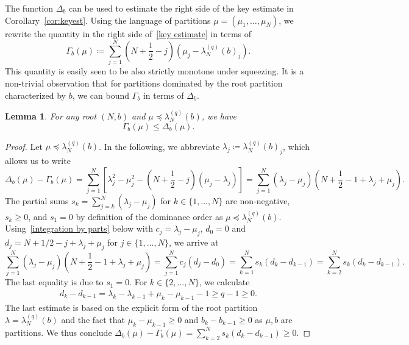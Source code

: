 \documentclass[letterpaper, DIV=17]{scrartcl}
\newtheorem{lemma}[theorem]{Lemma}
\numberwithin{equation}{section}
\theoremstyle{definition}
\begin{document}
The function $ \Delta_b $ can be used to estimate the right side of the key estimate in Corollary~\ref{cor:keyest}. Using the language of partitions $\mu=(\mu_1, \dots, \mu_N)$, we rewrite the quantity in the right side of~\eqref{key estimate} in terms of	
	\begin{equation}\label{def:Gamma}
			\Gamma_b(\mu) \coloneqq \sum_{j=1}^N (N+\frac{1}{2}-j)(\mu_j -\lambda_N^{(q)}(b)_j) .
	\end{equation}
	This quantity is easily seen to be also strictly monotone under squeezing. It is a non-trivial observation that
		for partitions dominated by the root partition characterized by $ b $, we can bound $\Gamma_b$ in terms of $\Delta_b$. 

	
		 \begin{lemma}\label{lem:GammaDelta}
		For any root $ (N,b)$ and $ \mu\preceq \lambda^{(q)}_N(b) $,
		we have
			\begin{equation} \label{Gamma bounded by Delta}
				\Gamma_b(\mu) \leq \Delta_b(\mu).
			\end{equation}  
		\end{lemma}
		\begin{proof}
			Let $\mu \preceq \lambda_N^{(q)}(b)$. In the following, we abbreviate $\lambda_j \coloneqq \lambda_N^{(q)}(b)_j$, which allows us to write
			$$
				\Delta_b(\mu) - \Gamma_b(\mu) = \sum_{j=1}^N \left[\lambda_j^2-\mu_j^2 - (N+\frac{1}{2}-j)(\mu_j-\lambda_j)\right]
				= \sum_{j=1}^N (\lambda_j-\mu_j)(N+\frac{1}{2}-1+\lambda_j+\mu_j).
			$$
			The partial sums $s_k=\sum_{j=k}^N (\lambda_j-\mu_j)$ for $k\in \{1, \dots, N\}$ are non-negative, $s_k\geq 0$, and $s_1=0$  by definition of the dominance order as  $\mu \preceq \lambda_N^{(q)}(b)$. 
			Using~\eqref{integration by parts} below with $c_j =\lambda_j-\mu_j$, $d_0=0$ and  $d_j=N+1/2-j+\lambda_j+\mu_j$ for $j\in \{1, \dots, N\}$, we arrive at 
			$$
				\sum_{j=1}^N (\lambda_j-\mu_j)(N+\frac{1}{2}-1+\lambda_j+\mu_j)
				=\sum_{j=1}^N c_j (d_j-d_0)
				= \sum_{k=1}^N s_k (d_k-d_{k-1})
				= \sum_{k=2}^N s_k (d_k-d_{k-1}).
			$$
			The last equality is due to $s_1=0$. For $k\in \{2, \dots, N\}$, we calculate 
			\begin{align*}
				d_k-d_{k-1} 
				= \lambda_k-\lambda_{k-1}+\mu_k -\mu_{k-1} -1
				\geq q -1 \geq 0.
			\end{align*}
			The last estimate is based on the explicit form of the root partition $ \lambda =\lambda_N^{(q)}(b) $ and the fact that $\mu_k-\mu_{k-1}\geq 0$ and $ b_k - b_{k-1} \geq 0 $ as $\mu, b$ are partitions. We thus conclude 	$ \Delta_b(\mu) - \Gamma_b(\mu) =\sum_{k=2}^N s_k (d_k-d_{k-1}) \geq 0 $. 
		\end{proof}
\end{document}
